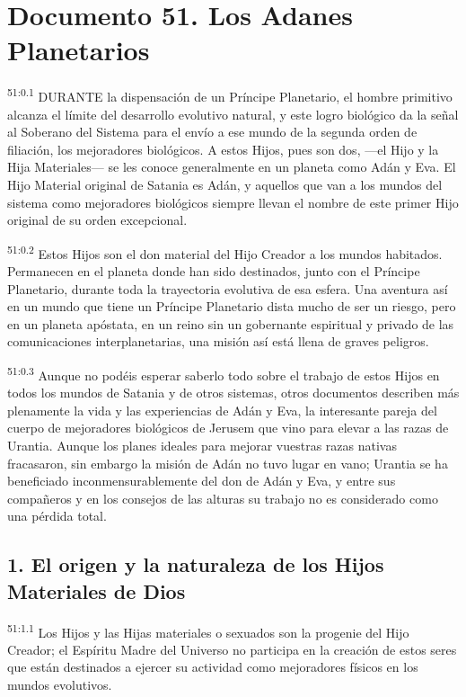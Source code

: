 \chapter{Documento 51. Los Adanes Planetarios}
\par
\textsuperscript{51:0.1} DURANTE la dispensación de un Príncipe Planetario, el hombre primitivo alcanza el límite del desarrollo evolutivo natural, y este logro biológico da la señal al Soberano del Sistema para el envío a ese mundo de la segunda orden de filiación, los mejoradores biológicos. A estos Hijos, pues son dos, ---el Hijo y la Hija Materiales--- se les conoce generalmente en un planeta como Adán y Eva. El Hijo Material original de Satania es Adán, y aquellos que van a los mundos del sistema como mejoradores biológicos siempre llevan el nombre de este primer Hijo original de su orden excepcional.

\par
\textsuperscript{51:0.2} Estos Hijos son el don material del Hijo Creador a los mundos habitados. Permanecen en el planeta donde han sido destinados, junto con el Príncipe Planetario, durante toda la trayectoria evolutiva de esa esfera. Una aventura así en un mundo que tiene un Príncipe Planetario dista mucho de ser un riesgo, pero en un planeta apóstata, en un reino sin un gobernante espiritual y privado de las comunicaciones interplanetarias, una misión así está llena de graves peligros.

\par
\textsuperscript{51:0.3} Aunque no podéis esperar saberlo todo sobre el trabajo de estos Hijos en todos los mundos de Satania y de otros sistemas, otros documentos describen más plenamente la vida y las experiencias de Adán y Eva, la interesante pareja del cuerpo de mejoradores biológicos de Jerusem que vino para elevar a las razas de Urantia. Aunque los planes ideales para mejorar vuestras razas nativas fracasaron, sin embargo la misión de Adán no tuvo lugar en vano; Urantia se ha beneficiado inconmensurablemente del don de Adán y Eva, y entre sus compañeros y en los consejos de las alturas su trabajo no es considerado como una pérdida total.

\section*{1. El origen y la naturaleza de los Hijos Materiales de Dios}
\par
\textsuperscript{51:1.1} Los Hijos y las Hijas materiales o sexuados son la progenie del Hijo Creador; el Espíritu Madre del Universo no participa en la creación de estos seres que están destinados a ejercer su actividad como mejoradores físicos en los mundos evolutivos.

